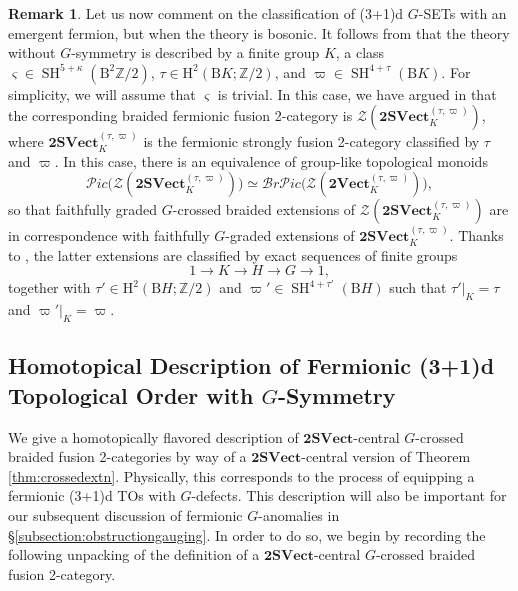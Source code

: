 \documentclass[11pt,reqno]{amsart}
\newcommand{\Z}{\mathbb{Z}}
\DeclareMathOperator{\SH}{SH}
\newcommand{\tSVect}{\mathbf{2SVect}}
\newcommand{\sPic}{\mathscr{P}ic}
\newcommand{\cZ}{\mathcal{Z}}
\newcommand{\rH}{\mathrm{H}}
\newcommand{\rB}{\mathrm{B}}
\numberwithin{equation}{section}
\theoremstyle{plain}
\theoremstyle{definition}
\newtheorem{rem}[equation]{Remark}
\begin{document}
\begin{rem}
Let us now comment on the classification of (3+1)d $G$-SETs with an emergent fermion, but when the theory is bosonic.
It follows from  that the theory without $G$-symmetry is described by a finite group $K$, a class $\varsigma\in \SH^{5+\kappa}(\rB^2\mathbb{Z}/2)$, $\tau \in \rH^2(\rB K;\Z/2)$, and $\varpi \in \SH^{4+\tau}(\rB K)$.
For simplicity, we will assume that $\varsigma$ is trivial.
In this case, we have argued in  that the corresponding braided fermionic fusion 2-category is $\cZ(\tSVect^{(\tau,\varpi)}_K)$, where $\tSVect^{(\tau,\varpi)}_K$ is the fermionic strongly fusion 2-category classified by $\tau$ and $\varpi$.
In this case, there is an equivalence of group-like topological monoids $$\sPic\big(\cZ(\tSVect^{(\tau,\varpi)}_K)\big) \simeq \mathscr{B}r\mathscr{P}ic\big(\cZ(\mathbf{2Vect}^{(\tau,\varpi)}_{K})\big),$$
so that faithfully graded $G$-crossed braided extensions of $\cZ(\tSVect^{(\tau,\varpi)}_K)$ are in correspondence with faithfully $G$-graded extensions of $\tSVect^{(\tau,\varpi)}_K$.
Thanks to \cite{D11}, the latter extensions are classified by exact sequences of finite groups
\begin{equation}
    1 \longrightarrow K \longrightarrow H \longrightarrow G \longrightarrow 1,
\end{equation}
together with $\tau' \in \rH^2(\rB H;\Z/2)$ and $\varpi' \in \SH^{4+\tau'}(\rB H)$ such that $\tau'|_K = \tau$ and $\varpi'|_K = \varpi$.
\end{rem}

\subsection{Homotopical Description of Fermionic (3+1)d Topological Order with $G$-Symmetry}

We give a homotopically flavored description of $\mathbf{2SVect}$-central $G$-crossed braided fusion 2-categories by way of a $\mathbf{2SVect}$-central version of Theorem \ref{thm:crossedextn}. Physically, this corresponds to the process of equipping a fermionic (3+1)d TOs with $G$-defects.
This description will also be important for our subsequent discussion of fermionic $G$-anomalies in \S\ref{subsection:obstructiongauging}. In order to do so, we begin by recording the following unpacking of the definition of a $\mathbf{2SVect}$-central $G$-crossed braided fusion 2-category.
\end{document}
